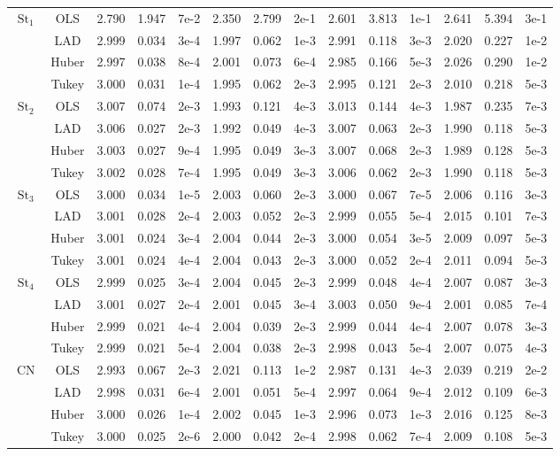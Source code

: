 \documentclass[12pt,a4paper]{article}
\newcommand{\Studentlaw}{\operatorname{St}}
\newcommand{\Tukeylaw}{\operatorname{CN}}
\begin{document}
\begin{center}
\begin{tabular}{|c|c||ccc|ccc||ccc|ccc|}
			\hline
			\multirow{4}{*}{$\Studentlaw_1$}
			& OLS   & 2.790 & 1.947 & 7e-2 & 2.350 & 2.799 & 2e-1 & 2.601 & 3.813 & 1e-1 & 2.641 & 5.394 & 3e-1 \\
			& LAD   & 2.999 & 0.034 & 3e-4 & 1.997 & 0.062 & 1e-3 & 2.991 & 0.118 & 3e-3 & 2.020 & 0.227 & 1e-2 \\
			& Huber & 2.997 & 0.038 & 8e-4 & 2.001 & 0.073 & 6e-4 & 2.985 & 0.166 & 5e-3 & 2.026 & 0.290 & 1e-2 \\
			& Tukey & 3.000 & 0.031 & 1e-4 & 1.995 & 0.062 & 2e-3 & 2.995 & 0.121 & 2e-3 & 2.010 & 0.218 & 5e-3 \\
			\hline
			\multirow{4}{*}{$\Studentlaw_2$}
			& OLS   & 3.007 & 0.074 & 2e-3 & 1.993 & 0.121 & 4e-3 & 3.013 & 0.144 & 4e-3 & 1.987 & 0.235 & 7e-3 \\
			& LAD   & 3.006 & 0.027 & 2e-3 & 1.992 & 0.049 & 4e-3 & 3.007 & 0.063 & 2e-3 & 1.990 & 0.118 & 5e-3 \\
			& Huber & 3.003 & 0.027 & 9e-4 & 1.995 & 0.049 & 3e-3 & 3.007 & 0.068 & 2e-3 & 1.989 & 0.128 & 5e-3 \\
			& Tukey & 3.002 & 0.028 & 7e-4 & 1.995 & 0.049 & 3e-3 & 3.006 & 0.062 & 2e-3 & 1.990 & 0.118 & 5e-3 \\
			\hline
			\multirow{4}{*}{$\Studentlaw_3$}
			& OLS   & 3.000 & 0.034 & 1e-5 & 2.003 & 0.060 & 2e-3 & 3.000 & 0.067 & 7e-5 & 2.006 & 0.116 & 3e-3 \\
			& LAD   & 3.001 & 0.028 & 2e-4 & 2.003 & 0.052 & 2e-3 & 2.999 & 0.055 & 5e-4 & 2.015 & 0.101 & 7e-3 \\
			& Huber & 3.001 & 0.024 & 3e-4 & 2.004 & 0.044 & 2e-3 & 3.000 & 0.054 & 3e-5 & 2.009 & 0.097 & 5e-3 \\
			& Tukey & 3.001 & 0.024 & 4e-4 & 2.004 & 0.043 & 2e-3 & 3.000 & 0.052 & 2e-4 & 2.011 & 0.094 & 5e-3 \\
			\hline
			\multirow{4}{*}{$\Studentlaw_4$}
			& OLS   & 2.999 & 0.025 & 3e-4 & 2.004 & 0.045 & 2e-3 & 2.999 & 0.048 & 4e-4 & 2.007 & 0.087 & 3e-3 \\
			& LAD   & 3.001 & 0.027 & 2e-4 & 2.001 & 0.045 & 3e-4 & 3.003 & 0.050 & 9e-4 & 2.001 & 0.085 & 7e-4 \\
			& Huber & 2.999 & 0.021 & 4e-4 & 2.004 & 0.039 & 2e-3 & 2.999 & 0.044 & 4e-4 & 2.007 & 0.078 & 3e-3 \\
			& Tukey & 2.999 & 0.021 & 5e-4 & 2.004 & 0.038 & 2e-3 & 2.998 & 0.043 & 5e-4 & 2.007 & 0.075 & 4e-3 \\
			\hline
			\multirow{4}{*}{$\Tukeylaw$}
			& OLS   & 2.993 & 0.067 & 2e-3 & 2.021 & 0.113 & 1e-2 & 2.987 & 0.131 & 4e-3 & 2.039 & 0.219 & 2e-2 \\
			& LAD   & 2.998 & 0.031 & 6e-4 & 2.001 & 0.051 & 5e-4 & 2.997 & 0.064 & 9e-4 & 2.012 & 0.109 & 6e-3 \\
			& Huber & 3.000 & 0.026 & 1e-4 & 2.002 & 0.045 & 1e-3 & 2.996 & 0.073 & 1e-3 & 2.016 & 0.125 & 8e-3 \\
			& Tukey & 3.000 & 0.025 & 2e-6 & 2.000 & 0.042 & 2e-4 & 2.998 & 0.062 & 7e-4 & 2.009 & 0.108 & 5e-3 \\
			\hline
		\end{tabular}
	\end{center}
	
\end{document}
